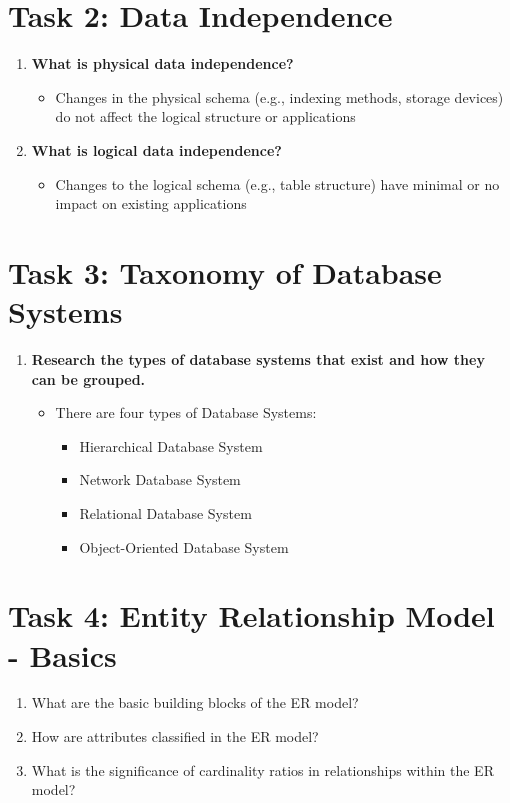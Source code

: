 \documentclass[10pt,a4paper]{article}
\begin{document}
\section*{Task 2: Data Independence}
\begin{enumerate}
\item \textbf{What is physical data independence?}
\begin{itemize}
	\item Changes in the physical schema (e.g., indexing methods, storage devices) do not affect the logical structure or applications
\end{itemize}

\item \textbf{What is logical data independence?}
\begin{itemize}
	\item Changes to the logical schema (e.g., table structure) have minimal or no impact on existing applications
\end{itemize}
\end{enumerate}


\section*{Task 3: Taxonomy of Database Systems}
\begin{enumerate}
\item \textbf{Research the types of database systems that exist and how they can be grouped.}
\begin{itemize}
	\item There are four types of Database Systems: \cite{database_systems}
	\begin{itemize}
		\item Hierarchical Database System
		\item Network Database System
		\item Relational Database System
		\item Object-Oriented Database System
	\end{itemize}
\end{itemize}
\end{enumerate}



\section*{Task 4: Entity Relationship Model - Basics}
\begin{enumerate}
\item What are the basic building blocks of the ER model?

\item How are attributes classified in the ER model?

\item What is the significance of cardinality ratios in relationships within the ER model?
\end{enumerate}
\end{document}

